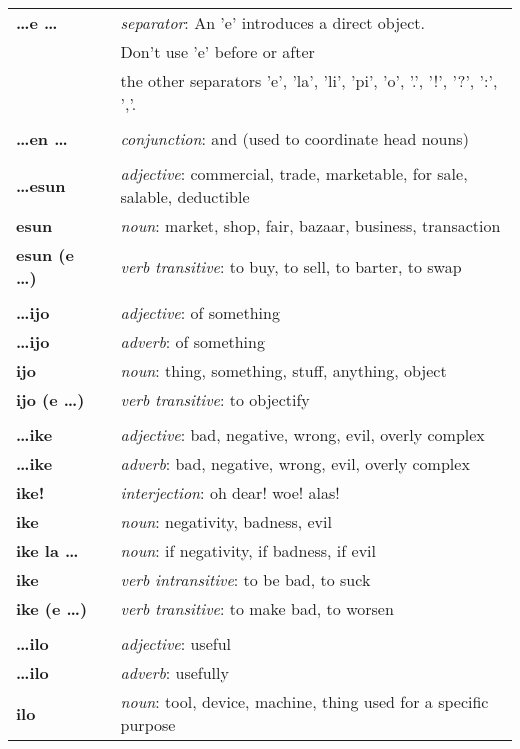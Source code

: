\begin{supertabular}{p{2,5cm}|ll}
\textbf{\dots e \dots} && \textit{separator}: An 'e' introduces a direct object. \\ && Don't use 'e' before or after \\ && the other separators 'e', 'la', 'li', 'pi', 'o', '.', '!', '?', ':', ','.  \\ 
 && \\ %
\textbf{\dots en \dots} && \textit{conjunction}: and (used to coordinate head nouns) \\ 
 && \\ %
\textbf{\dots esun} && \textit{adjective}: commercial, trade, marketable, for sale, salable, deductible \\  
\textbf{esun} && \textit{noun}: market, shop, fair, bazaar, business, transaction \\ 
\textbf{esun (e \dots)} && \textit{verb transitive}: to buy, to sell, to barter, to swap \\ 
 && \\ %
\textbf{\dots ijo} && \textit{adjective}: of something \\ 
\textbf{\dots ijo} && \textit{adverb}: of something \\ 
\textbf{ijo} && \textit{noun}: thing, something, stuff, anything, object \\ 
\textbf{ijo (e \dots)} && \textit{verb transitive}: to objectify \\ 
 && \\ %
\textbf{\dots ike} && \textit{adjective}: bad, negative, wrong, evil, overly complex \\ 
\textbf{\dots ike} && \textit{adverb}: bad, negative, wrong, evil, overly complex \\ 
\textbf{ike!} && \textit{interjection}: oh dear! woe! alas! \\ 
\textbf{ike} && \textit{noun}: negativity, badness, evil \\ 
\textbf{ike la \dots} && \textit{noun}: if negativity, if badness, if evil \\ 
\textbf{ike} && \textit{verb intransitive}: to be bad, to suck \\ 
\textbf{ike (e \dots)} && \textit{verb transitive}: to make bad, to worsen \\ 
 && \\ %
\textbf{\dots ilo} && \textit{adjective}: useful \\ 
\textbf{\dots ilo} && \textit{adverb}: usefully \\ 
\textbf{ilo} && \textit{noun}: tool, device, machine, thing used for a specific purpose \\ 

\end{supertabular}
